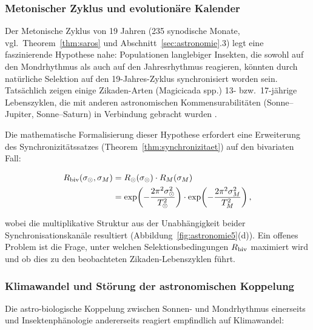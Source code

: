 ﻿\documentclass[12pt, a4paper]{article}
\theoremstyle{definition}
\begin{document}
\subsubsection{Metonischer Zyklus und evolutionäre Kalender}

Der Metonische Zyklus von 19 Jahren (235 synodische Monate, vgl.\
Theorem~\ref{thm:saros} und Abschnitt~\ref{sec:astronomie}.3) legt eine
faszinierende Hypothese nahe: Populationen langlebiger Insekten, die sowohl
auf den Mondrhythmus als auch auf den Jahresrhythmus reagieren, könnten durch
natürliche Selektion auf den 19-Jahres-Zyklus synchronisiert worden sein.
Tatsächlich zeigen einige Zikaden-Arten (Magicicada spp.) 13- bzw.\ 17-jährige
Lebenszyklen, die mit anderen astronomischen Kommensurabi\-litäten (Sonne--Jupiter,
Sonne--Saturn) in Verbindung gebracht wurden \cite{Yoshimura1997}.

Die mathematische Formalisierung dieser Hypothese erfordert eine Erweiterung des
Synchronizitätssatzes (Theorem~\ref{thm:synchronizitaet}) auf den bivariaten Fall:

\begin{align*}
  R_{\rm biv}(\sigma_{\odot}, \sigma_M) &= R_{\odot}(\sigma_{\odot})\cdot R_M(\sigma_M) \\
  &= \exp\!\left(-\frac{2\pi^2\sigma_{\odot}^2}{T_{\odot}^2}\right)
    \cdot\exp\!\left(-\frac{2\pi^2\sigma_M^2}{T_M^2}\right),
\end{align*}

wobei die multiplikative Struktur aus der Unabhängigkeit beider
Synchronisationskanäle resultiert (Abbildung~\ref{fig:astronomie5}(d)). Ein
offenes Problem ist die Frage, unter welchen Selektionsbedingungen $R_{\rm biv}$
maximiert wird und ob dies zu den beobachteten Zikaden-Lebenszyklen führt.

\subsubsection{Klimawandel und Störung der astronomischen Koppelung}

Die astro-biologische Koppelung zwischen Sonnen- und Mondrhythmus einerseits und
Insektenphänologie andererseits reagiert empfindlich auf Klimawandel:
\end{document}
